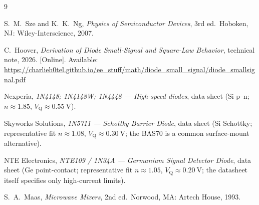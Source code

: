 \documentclass[12pt]{article}
\newcommand{\VQ}{V_{\mathrm{Q}}}
\begin{document}
\begin{thebibliography}{9}
\setlength{\itemsep}{2pt}
\setlength{\parsep}{0pt}

S.\ M.\ Sze and K.\ K.\ Ng, \textit{Physics of Semiconductor Devices}, 3rd ed.\ Hoboken, NJ: Wiley-Interscience, 2007.

C.\ Hoover, \textit{Derivation of Diode Small-Signal and Square-Law Behavior}, technical note, 2026. [Online]. Available: \url{https://charlieh0tel.github.io/ee_stuff/math/diode_small_signal/diode_smallsignal.pdf}

Nexperia, \textit{1N4148; 1N4148W; 1N4448 --- High-speed diodes}, data sheet (Si p--n; $n \approx 1.85$, $\VQ \approx \SI{0.55}{\volt}$).

Skyworks Solutions, \textit{1N5711 --- Schottky Barrier Diode}, data sheet (Si Schottky; representative fit $n \approx 1.08$, $\VQ \approx \SI{0.30}{\volt}$; the BAS70 is a common surface-mount alternative).

NTE Electronics, \textit{NTE109 / 1N34A --- Germanium Signal Detector Diode}, data sheet (Ge point-contact; representative fit $n \approx 1.05$, $\VQ \approx \SI{0.20}{\volt}$; the datasheet itself specifies only high-current limits).

S.\ A.\ Maas, \textit{Microwave Mixers}, 2nd ed.\ Norwood, MA: Artech House, 1993.

\end{thebibliography}
\end{document}
